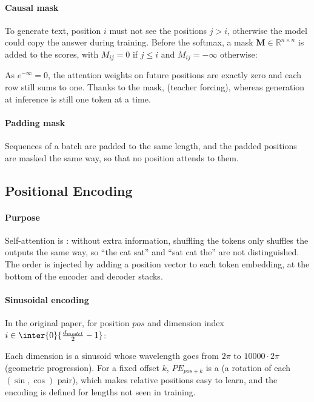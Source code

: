 \paragraph{Causal mask} To generate text, position $i$ must not see the positions $j>i$,
otherwise the model could copy the answer during training. Before the softmax, a mask
$\bm{M}\in\mathbb{R}^{n\times n}$ is added to the scores, with $M_{ij}=0$ if $j\leq i$ and
$M_{ij}=-\infty$ otherwise:
\begin{center}
\end{center}
As $e^{-\infty}=0$, the attention weights on future positions are exactly zero and each row
still sums to one. Thanks to the mask,  (teacher forcing), whereas
generation at inference is still one token at a time.

\paragraph{Padding mask} Sequences of a batch are padded to the same length, and the padded
positions are masked the same way, so that no position attends to them.

\subsection{Positional Encoding}
\paragraph{Purpose} Self-attention is : without extra
information, shuffling the tokens only shuffles the outputs the same way, so
``the cat sat'' and ``sat cat the'' are not distinguished. The order is injected by adding a
position vector to each token embedding, at the bottom of the encoder and decoder stacks.

\paragraph{Sinusoidal encoding} In the original paper, for position $pos$ and dimension
index $i\in\inter{0}{\frac{d_{model}}{2}-1}$:
\begin{center}
\end{center}
Each dimension is a sinusoid whose wavelength goes from $2\pi$ to $10000\cdot2\pi$
(geometric progression). For a fixed offset $k$, $PE_{pos+k}$ is a  (a rotation of each $(\sin,\cos)$ pair), which makes relative positions easy to
learn, and the encoding is defined for lengths not seen in training.


